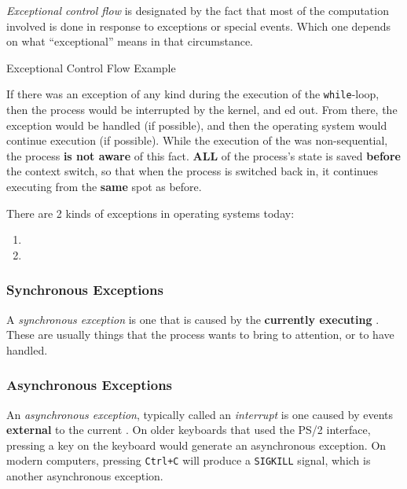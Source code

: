 \begin{definition}\label{def:Exceptional_Control_Flow}
  \emph{Exceptional control flow} is designated by the fact that most of the computation involved is done in response to exceptions or special events.
  Which one depends on what ``exceptional'' means in that circumstance.
\end{definition}

\begin{listing}[h!tbp]
\caption{Exceptional Control Flow Example}
\label{lst:Exceptional_Control_Flow}
\end{listing}

If there was an exception of any kind during the execution of the \texttt{while}-loop, then the process would be interrupted by the kernel, and ed out.
From there, the exception would be handled (if possible), and then the operating system would continue execution (if possible).
While the execution of the  was non-sequential, the process \textbf{is not aware} of this fact.
{\large\textbf{ALL}} of the process's state is saved \textbf{before} the context switch, so that when the process is switched back in, it continues executing from the \textbf{same} spot as before.

There are 2 kinds of exceptions in operating systems today:
\begin{enumerate}[noitemsep]
\item {}
\item {}
\end{enumerate}

\subsubsection{Synchronous Exceptions}\label{subsubsec:Synchronous_Exceptions}
\begin{definition}\label{def:Synchronous_Exception}
  A \emph{synchronous exception} is one that is caused by the \textbf{currently executing} .
  These are usually things that the process wants to bring to attention, or to have handled.
\end{definition}

\subsubsection{Asynchronous Exceptions}\label{subsubsec:Asynchronous_Exceptions}
\begin{definition}\label{def:Asynchronous_Exception}
  An \emph{asynchronous exception}, typically called an \emph{interrupt} is one caused by events \textbf{external} to the current .
  On older keyboards that used the PS/2 interface, pressing a key on the keyboard would generate an asynchronous exception.
  On modern computers, pressing \texttt{Ctrl+C} will produce a \texttt{SIGKILL} signal, which is another asynchronous exception.
\end{definition}


